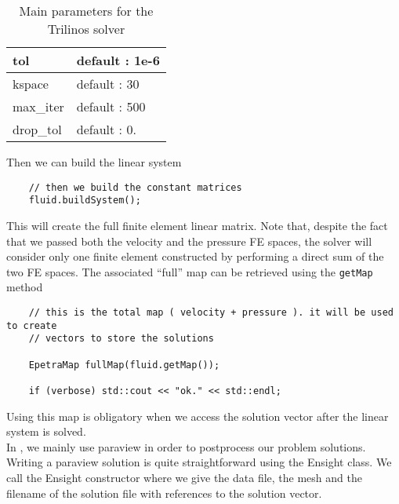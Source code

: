 \begin{table}
\begin{center}
\begin{tabular}{|l|l|}
tol   & default : 1e-6  \\

\hline

kspace & default : 30  \\

\hline

max\_iter & default : 500  \\

\hline

drop\_tol & default : 0. \\

\hline

\end{tabular}
\end{center}
\caption{Main parameters for the Trilinos solver}
\label{table-solveroptions}
\end{table}

Then we can build the linear system
\begin{verbatim}
    // then we build the constant matrices
    fluid.buildSystem();
\end{verbatim}

This will create the full finite element linear matrix. Note that, despite the fact
that we passed both the velocity and the pressure FE spaces, the solver will consider
only one finite element constructed by performing a direct sum of the two FE spaces.
The associated ``full'' map can be retrieved using the \verb|getMap| method 

\begin{verbatim}
    // this is the total map ( velocity + pressure ). it will be used to create
    // vectors to store the solutions

    EpetraMap fullMap(fluid.getMap());

    if (verbose) std::cout << "ok." << std::endl;
\end{verbatim}

Using this map is obligatory when we access the solution vector after the linear system is solved.\\

In \lifev, we mainly use paraview in order to postprocess our problem solutions.
Writing a paraview solution is quite straightforward using the Ensight class.
We call the Ensight constructor where we give the data file, the mesh and the filename of the solution file
with references to the solution vector.

